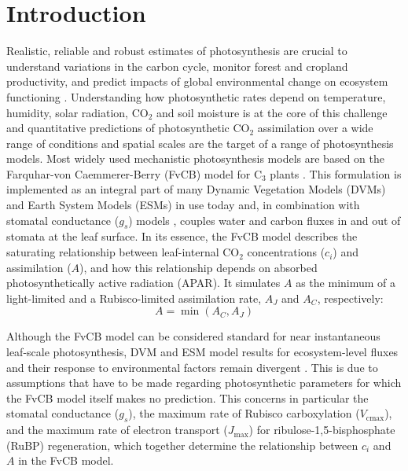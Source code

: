 \documentclass{myreport}
\newcommand{\vcmax}{$V_{\text{cmax}}$}
\newcommand{\jmax}{$J_{\text{max}}$}
\begin{document}
\section{Introduction}

Realistic, reliable and robust estimates of photosynthesis are crucial to understand variations in the carbon cycle, monitor forest and cropland productivity, and predict impacts of global environmental change on ecosystem functioning \citep{prentice15}. Understanding how photosynthetic rates depend on temperature, humidity, solar radiation, CO$_2$ and soil moisture is at the core of this challenge and quantitative predictions of photosynthetic CO$_2$ assimilation over a wide range of conditions and spatial scales are the target of a range of photosynthesis models. Most widely used mechanistic photosynthesis models are based on the Farquhar-von Caemmerer-Berry (FvCB) model for C$_3$ plants \citep{farquhar80, voncaemmerer81}. This formulation is implemented as an integral part of many Dynamic Vegetation Models (DVMs) and Earth System Models (ESMs) in use today \cite{rogers17} and, in combination with stomatal conductance ($g_s$) models \citep{ball87, leuning95pce, medlyn11gcb}, couples water and carbon fluxes in and out of stomata at the leaf surface. In its essence, the FvCB model describes the saturating relationship between leaf-internal CO$_2$ concentrations ($c_i$) and assimilation ($A$), and how this relationship depends on absorbed photosynthetically active radiation (APAR). It simulates $A$ as the minimum of a light-limited and a Rubisco-limited assimilation rate, $A_J$ and $A_C$, respectively:
\begin{equation}
    A = \min(A_C, A_J)
\end{equation}


Although the FvCB model can be considered standard for near instantaneous leaf-scale photosynthesis, DVM and ESM model results for ecosystem-level fluxes and their response to environmental factors remain divergent \citep{rogers17}. This is due to assumptions that have to be made regarding photosynthetic parameters for which the FvCB model itself makes no prediction. This concerns in particular the stomatal conductance ($g_s$), the maximum rate of Rubisco carboxylation (\vcmax ), and the maximum rate of electron transport (\jmax ) for ribulose-1,5-bisphosphate (RuBP) regeneration, which together determine the relationship between $c_i$ and $A$ in the FvCB model. 
\end{document}
